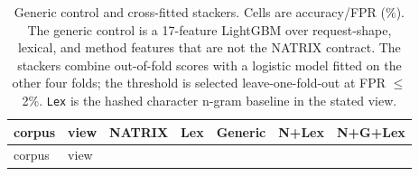 \documentclass[preprint,11pt]{elsarticle}
\begin{document}
{
\begingroup\scriptsize\setlength{\tabcolsep}{3pt}
\begin{longtable}[]{@{}
  >{\raggedright\arraybackslash}p{}
  >{\raggedright\arraybackslash}p{}
  >{\raggedleft\arraybackslash}p{}
  >{\raggedleft\arraybackslash}p{}
  >{\raggedleft\arraybackslash}p{}
  >{\raggedleft\arraybackslash}p{}
  >{\raggedleft\arraybackslash}p{}@{}}
\caption{Generic control and cross-fitted stackers. Cells are
accuracy/FPR (\%). The generic control is a 17-feature LightGBM over
request-shape, lexical, and method features that are not the NATRIX
contract. The stackers combine out-of-fold scores with a logistic model
fitted on the other four folds; the threshold is selected
leave-one-fold-out at FPR $\le$ 2\%. \texttt{Lex} is the hashed
character n-gram baseline in the stated view.}\label{tab:control-models}\\
\toprule\noalign{}
\begin{minipage}[t]{\linewidth}\raggedright
corpus
\end{minipage} & \begin{minipage}[t]{\linewidth}\raggedright
view
\end{minipage} & \begin{minipage}[t]{\linewidth}\raggedleft
NATRIX
\end{minipage} & \begin{minipage}[t]{\linewidth}\raggedleft
Lex
\end{minipage} & \begin{minipage}[t]{\linewidth}\raggedleft
Generic
\end{minipage} & \begin{minipage}[t]{\linewidth}\raggedleft
N+Lex
\end{minipage} & \begin{minipage}[t]{\linewidth}\raggedleft
N+G+Lex
\end{minipage} \\
\midrule\noalign{}
\endfirsthead
\toprule\noalign{}
\begin{minipage}[t]{\linewidth}\raggedright
corpus
\end{minipage} & \begin{minipage}[t]{\linewidth}\raggedright
view
\end{minipage} & \begin{minipage}[t]{\linewidth}\raggedleft

\end{minipage}
\end{longtable}}
\end{document}
